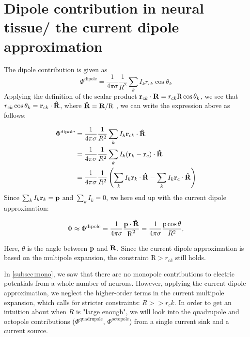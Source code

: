 \section{Dipole contribution in neural tissue/ the current dipole approximation}
The dipole contribution is given as 
\begin{equation*}
\Phi^{\mathrm{dipole}} = \frac{1}{4 \pi \sigma} \frac{1}{R^2} \sum_k I_k r_{ck} \cos \theta_k
\end{equation*}
Applying the definition of the scalar product ${\bf r}_{ck} \cdot {\bf R} = r_{ck} \text{R} \cos \theta_k$, we see that $r_{ck} \cos \theta_k = {\bf r}_{ck} \cdot {\bf \hat{R}}$, where $\hat{{\bf R}} = {\bf R}/\text{R}$ , we can write the expression above as follows:

\begin{align*}
\Phi^{\mathrm{dipole}} &= \frac{1}{4 \pi \sigma} \frac{1}{R^2} \sum_k I_k {\bf r}_{ck} \cdot {\bf \hat{R}} \\
		   &= \frac{1}{4 \pi \sigma} \frac{1}{R^2} \sum_k I_k ({\bf r}_{k} - {\bf r}_{c}) \cdot {\bf \hat{R}} \\
 		   &= \frac{1}{4 \pi \sigma} \frac{1}{R^2} \left(\sum_k I_k {\bf r}_{k} \cdot {\bf \hat{R}} - \sum_k I_k {\bf r}_{c} \cdot {\bf \hat{R}} \right)
\end{align*}
Since $\sum_k I_k {\bf r}_k = {\bf p}$ and $\sum_k I_k = 0$, we here end up with the current dipole approximation:

\begin{equation}
\Phi \approx \Phi^{\mathrm{dipole}} = \frac{1}{4 \pi \sigma} \frac{{\bf p} \cdot {\bf \hat{R}}}{\text{R}^2} = \frac{1}{4 \pi \sigma} \frac{\text{p} \cos \theta}{R^2},
\end{equation}

Here, $\theta$ is the angle between ${\bf p}$ and ${\bf R}$. Since the current dipole approximation is based on the multipole expansion, the constraint $\text{R} > r_{ck}$ still holds.

In \ref{subsec:mono}, we saw that there are no monopole contributions to electric potentials from a whole number of neurons. However, applying the current-dipole approximation, we neglect the higher-order terms in the current multipole expansion, which calls for stricter constraints: $R >> r_ck$. In order to get an intuition about when $R$ is "large enough", we will look into the quadrupole and octopole contributions ($\Phi^{\mathrm{quadrupole}}$, $\Phi^{\mathrm{octopole}}$) from a single current sink and a current source.


